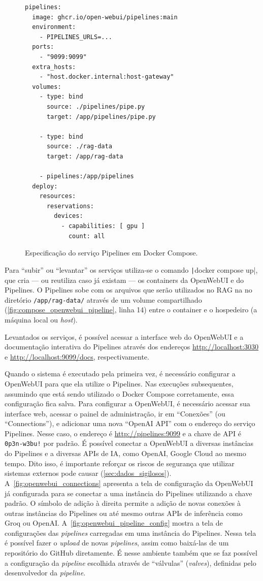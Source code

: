 \documentclass[journal]{IEEEtran}
\begin{document}
\begin{figure}[!ht]
    \begin{verbatim}
pipelines:
  image: ghcr.io/open-webui/pipelines:main
  environment:
    - PIPELINES_URLS=...
  ports:
    - "9099:9099"
  extra_hosts:
    - "host.docker.internal:host-gateway"
  volumes:
    - type: bind
      source: ./pipelines/pipe.py
      target: /app/pipelines/pipe.py

    - type: bind
      source: ./rag-data
      target: /app/rag-data

    - pipelines:/app/pipelines
  deploy:
    resources:
      reservations:
        devices:
          - capabilities: [ gpu ]
            count: all
    \end{verbatim}
    \caption{Especificação do serviço Pipelines em Docker Compose.\label{fig:compose_openwebui_pipeline}}
\end{figure}

Para ``subir'' ou ``levantar'' os serviços utiliza-se o comando \texttt|docker compose up|, que cria --- ou reutiliza caso já existam --- os containers da OpenWebUI e do Pipelines.
O Pipelines sobe com os arquivos que serão utilizados no RAG na no diretório \texttt{/app/rag-data/} através de um volume compartilhado (\autoref{fig:compose_openwebui_pipeline}, linha 14) entre o container e o hospedeiro (a máquina local ou \textit{host}).

Levantados os serviços, é possível acessar a interface web do OpenWebUI e a documentação interativa do Pipelines através dos endereços \url{http://localhost:3030} e \url{http://localhost:9099/docs}, respectivamente.

Quando o sistema é executado pela primeira vez, é necessário configurar a OpenWebUI para que ela utilize o Pipelines.
Nas execuções subsequentes, assumindo que está sendo utilizado o Docker Compose corretamente, essa configuração fica salva.
Para configurar a OpenWebUI, é necessário acessar sua interface web, acessar o painel de administração, ir em ``Conexões'' (ou ``Connections''), e adicionar uma nova ``OpenAI API'' com o endereço do serviço Pipelines.
Nesse caso, o endereço é \url{http://pipelines:9099} e a chave de API é \texttt{0p3n-w3bu!} por padrão.
É possível conectar a OpenWebUI a diversas instâncias do Pipelines e a diversas APIs de IA, como OpenAI, Google Cloud ao mesmo tempo.
Dito isso, é importante reforçar os riscos de segurança que utilizar sistemas externos pode causar (\cref{sec:dados_sigilosos}).
A~\cref{fig:openwebui_connections} apresenta a tela de configuração da OpenWebUI já configurada para se conectar a uma instância do Pipelines utilizando a chave padrão.
O símbolo de adição à direita permite a adição de novas conexões à outras instâncias do Pipelines ou até mesmo outras APIs de inferência como Groq ou OpenAI\@.
A~\cref{fig:openwebui_pipeline_config} mostra a tela de configurações das \textit{pipelines} carregadas em uma instância do Pipelines.
Nessa tela é possível fazer o \textit{upload} de novas \textit{pipelines}, assim como baixá-las de um repositório do GitHub diretamente.
É nesse ambiente também que se faz possível a configuração da \textit{pipeline} escolhida através de ``válvulas'' (\textit{valves}), definidas pelo desenvolvedor da \textit{pipeline}.
\end{document}
